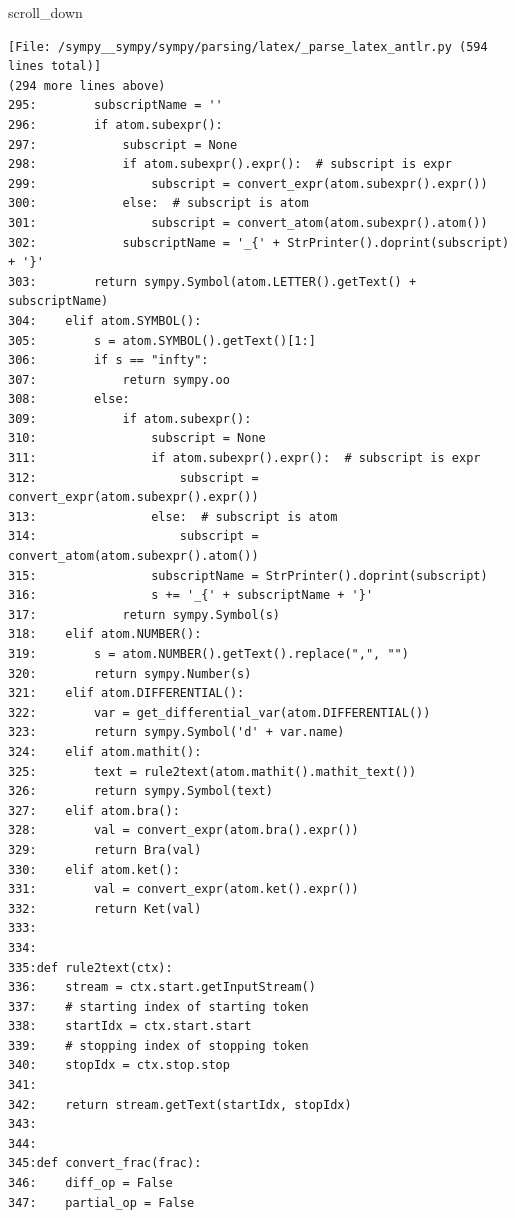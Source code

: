 {\begin{agentbox}
\hrulefill
\begin{CodeVerbatim}[breaklines=true, breakanywhere=true]
scroll_down
\end{CodeVerbatim}
\end{agentbox}
\begin{observationbox}\begin{Verbatim}[breaklines=true, breakanywhere=true]
[File: /sympy__sympy/sympy/parsing/latex/_parse_latex_antlr.py (594 lines total)]
(294 more lines above)
295:        subscriptName = ''
296:        if atom.subexpr():
297:            subscript = None
298:            if atom.subexpr().expr():  # subscript is expr
299:                subscript = convert_expr(atom.subexpr().expr())
300:            else:  # subscript is atom
301:                subscript = convert_atom(atom.subexpr().atom())
302:            subscriptName = '_{' + StrPrinter().doprint(subscript) + '}'
303:        return sympy.Symbol(atom.LETTER().getText() + subscriptName)
304:    elif atom.SYMBOL():
305:        s = atom.SYMBOL().getText()[1:]
306:        if s == "infty":
307:            return sympy.oo
308:        else:
309:            if atom.subexpr():
310:                subscript = None
311:                if atom.subexpr().expr():  # subscript is expr
312:                    subscript = convert_expr(atom.subexpr().expr())
313:                else:  # subscript is atom
314:                    subscript = convert_atom(atom.subexpr().atom())
315:                subscriptName = StrPrinter().doprint(subscript)
316:                s += '_{' + subscriptName + '}'
317:            return sympy.Symbol(s)
318:    elif atom.NUMBER():
319:        s = atom.NUMBER().getText().replace(",", "")
320:        return sympy.Number(s)
321:    elif atom.DIFFERENTIAL():
322:        var = get_differential_var(atom.DIFFERENTIAL())
323:        return sympy.Symbol('d' + var.name)
324:    elif atom.mathit():
325:        text = rule2text(atom.mathit().mathit_text())
326:        return sympy.Symbol(text)
327:    elif atom.bra():
328:        val = convert_expr(atom.bra().expr())
329:        return Bra(val)
330:    elif atom.ket():
331:        val = convert_expr(atom.ket().expr())
332:        return Ket(val)
333:
334:
335:def rule2text(ctx):
336:    stream = ctx.start.getInputStream()
337:    # starting index of starting token
338:    startIdx = ctx.start.start
339:    # stopping index of stopping token
340:    stopIdx = ctx.stop.stop
341:
342:    return stream.getText(startIdx, stopIdx)
343:
344:
345:def convert_frac(frac):
346:    diff_op = False
347:    partial_op = False

\end{Verbatim}
\end{observationbox}}
